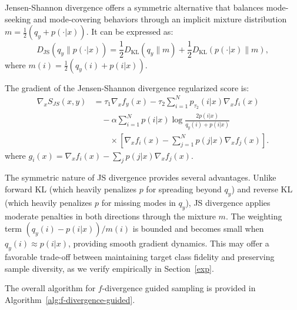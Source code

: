 \documentclass{article}
\begin{document}
Jensen-Shannon divergence offers a symmetric alternative that balances mode-seeking and mode-covering behaviors through an implicit mixture distribution $m = \frac{1}{2}(q_y + p(\cdot|x))$. It can be expressed as:
\begin{equation}
D_{\text{JS}}(q_y \| p(\cdot|x)) = \frac{1}{2}D_{\text{KL}}(q_y \| m) + \frac{1}{2}D_{\text{KL}}(p(\cdot|x) \| m),
\label{eq:js_definition}
\end{equation}
where $m(i) = \frac{1}{2}(q_y(i) + p(i|x))$.
\begin{corollary}
\label{cor:js_gradient}
The gradient of the Jensen-Shannon divergence regularized score is:
\begin{equation}
\begin{aligned}
\nabla_x S_{JS}(x,y) &= \tau_1\nabla_x f_y(x) - \tau_2 \sum_{i=1}^N p_{\tau_2}(i|x)\nabla_x f_i(x) \nonumber\\
&\quad - \alpha \sum_{i=1}^N p(i|x)\log\frac{2p(i|x)}{q_y(i) + p(i|x)} \nonumber\\
&\quad\quad \times \left[\nabla_x f_i(x) - \sum_{j=1}^N p(j|x)\nabla_x f_j(x)\right].
\end{aligned}
\label{eq:js_gradient}
\end{equation}
where $g_i(x) = \nabla_x f_i(x) - \sum_j p(j|x)\nabla_x f_j(x)$.
\end{corollary}

The symmetric nature of JS divergence provides several advantages. Unlike forward KL (which heavily penalizes $p$ for spreading beyond $q_y$) and reverse KL (which heavily penalizes $p$ for missing modes in $q_y$), JS divergence applies moderate penalties in both directions through the mixture $m$. The weighting term $(q_y(i) - p(i|x))/m(i)$ is bounded and becomes small when $q_y(i) \approx p(i|x)$, providing smooth gradient dynamics. This may offer a favorable trade-off between maintaining target class fidelity and preserving sample diversity, as we verify empirically in Section~\ref{exp}.

The overall algorithm for $f$-divergence guided sampling is provided in Algorithm~\ref{alg:f-divergence-guided}.
\end{document}
